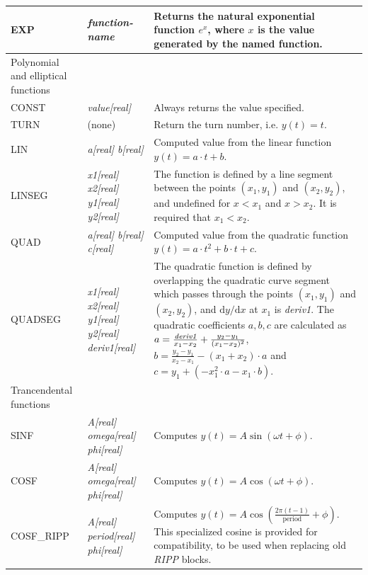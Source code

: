 \documentclass[a4paper,11pt]{report}
\begin{document}
\begin{center}
\begin{longtable}{|p{2.25cm} | p{4cm} p{9.5cm}|}
  EXP        & \emph{function-name} &
  Returns the natural exponential function $e^x$, where $x$ is the value generated by the named function. \\
  
  \hline
  \rowcolor{blue!15}
  Polynomial and elliptical functions &  & \\*

  CONST       & \emph{value[real]} & 
  Always returns the value specified.\\*

  TURN        & (none) & 
  Return the turn number, i.e. $y(t) = t$.\\*

  LIN         & \emph{a[real] b[real]} & 
  Computed value from the linear function $y(t) = a\cdot t + b$. \\*

  LINSEG      & \emph{x1[real] x2[real] y1[real] y2[real]} & 
  The function is defined by a line segment between the points $(x_1,y_1)$ and $(x_2,y_2)$, and undefined for $x < x_1$ and $x>x_2$. 
  It is required that $x_1 < x_2$.\\*

  QUAD        & \emph{a[real] b[real] c[real]} & 
  Computed value from the quadratic function $y(t) = a\cdot t^2 + b\cdot t + c$. \\*

  QUADSEG     & \emph{x1[real] x2[real] y1[real] y2[real] deriv1[real]} & 
  The quadratic function is defined by overlapping the quadratic curve segment which passes through the points $(x_1,y_1)$ and $(x_2,y_2)$, and $\mathrm{d}y/\mathrm{d}x$ at $x_1$ is \emph{deriv1}. 
  The quadratic coefficients $a,b,c$ are calculated as $a = \frac{\emph{deriv1}}{x_1-x_2} + \frac{y_2-y_1}{(x_1-x_2)^2}$, $b=\frac{y_2-y_1}{x_2-x_1} - (x_1+x_2)\cdot a$ and $c = y_1 + \left(- x_1^2 \cdot a - x_1 \cdot b \right)$.\\

  \hline
  \rowcolor{blue!15}
  Trancendental functions & & \\*

  SINF        & \emph{A[real] omega[real] phi[real]} & 
  Computes $y(t) = A\sin\left(\omega t + \phi\right)$.\\*

  COSF        & \emph{A[real] omega[real] phi[real]} & 
  Computes $y(t) = A\cos\left(\omega t + \phi\right)$.\\*
  COSF\_RIPP  & \emph{A[real] period[real] phi[real]} & 
  Computes $y(t) = A\cos\left(\frac{2\pi (t-1)}{\mathrm{period}} + \phi\right)$. 
  This specialized cosine is provided for compatibility, to be used when replacing old \emph{RIPP} blocks.\\*


\end{longtable}
\end{center}
\end{document}
